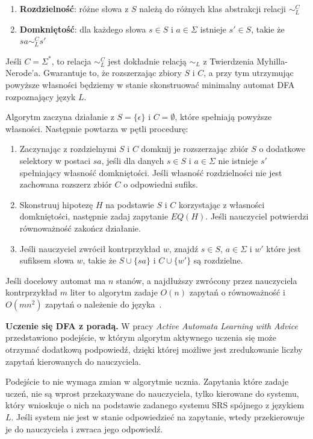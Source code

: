 \begin{enumerate}
  \item \textbf{Rozdzielność}: różne słowa z $S$ należą do różnych klas abstrakcji relacji $\sim^C_L$
  \item \textbf{Domkniętość}: dla każdego słowa $s \in S$ i $a \in \Sigma$ istnieje $s' \in S$, takie że $sa \sim^C_L s'$
\end{enumerate}

Jeśli $C = \Sigma^*$, to relacja $\sim^C_L$ jest dokładnie relacją $\sim_L$ z Twierdzenia Myhilla-Nerode'a.
Gwarantuje to, że rozszerzając zbiory $S$ i $C$, a przy tym utrzymując powyższe własności będziemy w stanie skonstruować minimalny automat DFA
rozpoznający język $L$.

Algorytm zaczyna działanie z $S = \{\epsilon\}$ i $C = \emptyset$, które spełniają powyższe własności. Następnie powtarza w pętli procedurę:

\begin{enumerate}
    \item Zaczynając z rozdzielnymi $S$ i $C$ domknij je rozszerzając zbiór $S$ o dodatkowe selektory w postaci $sa$,
    jeśli dla danych $s \in S$ i $a \in \Sigma$ nie istnieje $s'$ spełniający własność domkniętości.
    Jeśli własność rozdzielności nie jest zachowana rozszerz zbiór $C$ o odpowiedni sufiks.

    \item Skonstruuj hipotezę $H$ na podstawie $S$ i $C$ korzystając z własności domkniętości, następnie zadaj zapytanie $EQ(H)$.
    Jeśli nauczyciel potwierdzi równoważność zakończ działanie.

    \item Jeśli nauczyciel zwrócił kontrprzykład $w$, znajdź $s \in S$, $a \in \Sigma$ i $w'$ które jest sufiksem słowa $w$,
    takie że $S \cup \{sa\}$ i $C \cup \{w'\}$ są rozdzielne.
\end{enumerate}

Jeśli docelowy automat ma $n$ stanów, a najdłuższy zwrócony przez nauczyciela kontrprzykład $m$ liter to algorytm zadaje
$O(n)$ zapytań o równoważność i $O(mn^2)$ zapytań o należenie do języka~\cite{Angluin}.

\textbf{Uczenie się DFA z poradą.} W pracy \textit{Active Automata Learning with Advice}~\cite{srs} przedstawiono podejście,
w którym algorytm aktywnego uczenia się może otrzymać dodatkową podpowiedź, dzięki której możliwe jest zredukowanie
liczby zapytań kierowanych do nauczyciela.

Podejście to nie wymaga zmian w algorytmie ucznia. Zapytania które zadaje uczeń, nie są wprost przekazywane do nauczyciela,
tylko kierowane do systemu, który wnioskuje o nich na podstawie zadanego systemu SRS spójnego z językiem $L$.
Jeśli system nie jest w stanie odpowiedzieć na zapytanie, wtedy przekierowuje je do nauczyciela i zwraca jego odpowiedź.

